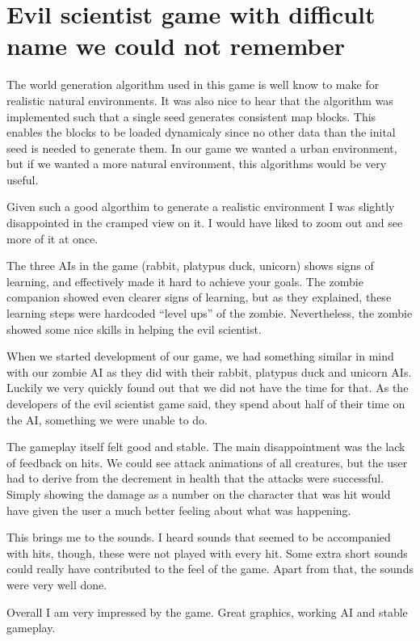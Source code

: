 \section{Evil scientist game with difficult name we could not remember}

The world generation algorithm used in this game is well know to make for realistic natural environments. It was also nice to hear that the algorithm was implemented such that a single seed generates consistent map blocks. This enables the blocks to be loaded dynamicaly since no other data than the inital seed is needed to generate them. In our game we wanted a urban environment, but if we wanted a more natural environment, this algorithms would be very useful.

Given such a good algorthim to generate a realistic environment I was slightly disappointed in the cramped view on it. I would have liked to zoom out and see more of it at once.


The three AIs in the game (rabbit, platypus duck, unicorn) shows signs of learning, and effectively made it hard to achieve your goals. The zombie companion showed even clearer signs of learning, but as they explained, these learning steps were hardcoded ``level ups'' of the zombie. Nevertheless, the zombie showed some nice skills in helping the evil scientist.

When we started development of our game, we had something similar in mind with our zombie AI as they did with their rabbit, platypus duck and unicorn AIs. Luckily we very quickly found out that we did not have the time for that. As the developers of the evil scientist game said, they spend about half of their time on the AI, something we were unable to do.

The gameplay itself felt good and stable. The main disappointment was the lack of feedback on hits. We could see attack animations of all creatures, but the user had to derive from the decrement in health that the attacks were successful. Simply showing the damage as a number on the character that was hit would have given the user a much better feeling about what was happening.

This brings me to the sounds. I heard sounds that seemed to be accompanied with hits, though, these were not played with every hit. Some extra short sounds could really have contributed to the feel of the game. Apart from that, the sounds were very well done.

Overall I am very impressed by the game. Great graphics, working AI and stable gameplay.